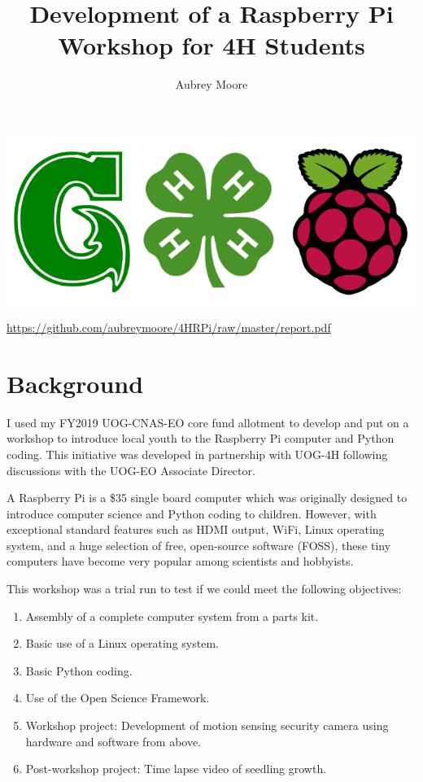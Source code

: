 \documentclass[12pt,letterpaper,english,bibliography=totocnumbered]{scrartcl}
\begin{document}
\titlehead{Report on Use of FY2018 UOG-CNAS-EO Core Funds}
\title{Development of a Raspberry Pi Workshop for 4H Students}
\author{Aubrey Moore}
\maketitle

\begin{center}
\includegraphics[width=0.7\linewidth]{UOG-4H-RPi.png}
\end{center}



\begin{center}
\url{https://github.com/aubreymoore/4HRPi/raw/master/report.pdf}
\end{center}

\tableofcontents{}

\newpage
\section{Background}

I used my FY2019 UOG-CNAS-EO core fund allotment to develop and put on a workshop to introduce local youth to the Raspberry Pi computer and Python coding. This initiative was developed in partnership with UOG-4H following discussions with the UOG-EO Associate Director. 

A Raspberry Pi is a \$35 single board computer which was originally designed to introduce computer science and Python coding to children. However, with exceptional standard features such as HDMI output, WiFi, Linux operating system, and a huge selection of free, open-source software (FOSS), these tiny computers have become very popular among scientists and hobbyists.

This workshop was a trial run to test if we could meet the following objectives:
\begin{enumerate}
	\item Assembly of a complete computer system from a parts kit.
	\item Basic use of a Linux operating system.
	\item Basic Python coding.
	\item Use of the Open Science Framework.
	\item Workshop project: Development of motion sensing security camera using hardware and software from above.
	\item Post-workshop project: Time lapse video of seedling growth.
\end{enumerate}
\end{document}
